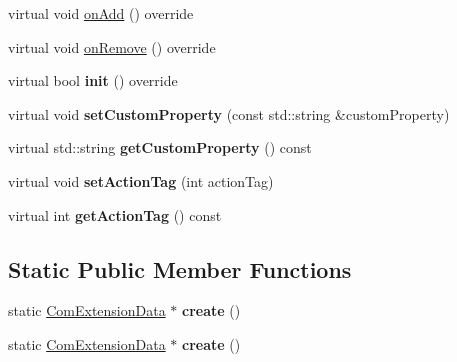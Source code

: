\begin{DoxyCompactItemize}
\item 
virtual void \hyperlink{classcocostudio_1_1ComExtensionData_aeea9aa3a81a9ce53c1a8edcb40ce0416}{on\+Add} () override
\item 
virtual void \hyperlink{classcocostudio_1_1ComExtensionData_afca0501d8582030e815217309ba81a15}{on\+Remove} () override
\item 
\mbox{\label{classcocostudio_1_1ComExtensionData_a776c5564cf3599a33c923d62eb2ee82c}} 
virtual bool {\bfseries init} () override
\item 
\mbox{\label{classcocostudio_1_1ComExtensionData_a2a35c4e020fbc789020dbcbec4749c07}} 
virtual void {\bfseries set\+Custom\+Property} (const std\+::string \&custom\+Property)
\item 
\mbox{\label{classcocostudio_1_1ComExtensionData_a2d029b9b6e9ea18c610e2e9d37617e10}} 
virtual std\+::string {\bfseries get\+Custom\+Property} () const
\item 
\mbox{\label{classcocostudio_1_1ComExtensionData_a91ca7f7928334f0da72e8c02d3e9ba5a}} 
virtual void {\bfseries set\+Action\+Tag} (int action\+Tag)
\item 
\mbox{\label{classcocostudio_1_1ComExtensionData_a573f034c6b0cc00c4eedd6e038a0ae34}} 
virtual int {\bfseries get\+Action\+Tag} () const
\end{DoxyCompactItemize}
\subsection*{Static Public Member Functions}
\begin{DoxyCompactItemize}
\item 
\mbox{\label{classcocostudio_1_1ComExtensionData_a472bf24f6d036e0b14e9c9e437bee7d1}} 
static \hyperlink{classcocostudio_1_1ComExtensionData}{Com\+Extension\+Data} $\ast$ {\bfseries create} ()
\item 
\mbox{\label{classcocostudio_1_1ComExtensionData_ae6bb079b6f3b0f71be1a3844da1ded04}} 
static \hyperlink{classcocostudio_1_1ComExtensionData}{Com\+Extension\+Data} $\ast$ {\bfseries create} ()
\end{DoxyCompactItemize}
